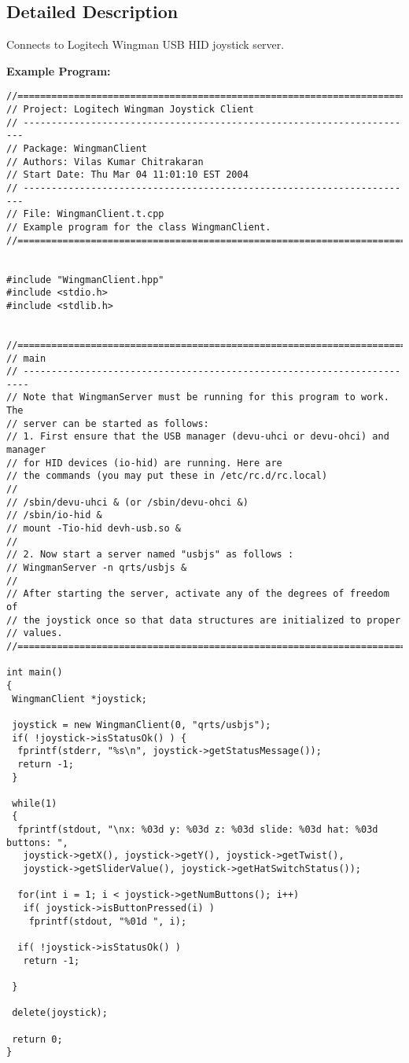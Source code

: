 \subsection{Detailed Description}
Connects to Logitech Wingman USB HID joystick server.

{\bf Example Program:}

\footnotesize\begin{verbatim}//======================================================================== 
// Project: Logitech Wingman Joystick Client 
// ---------------------------------------------------------------------- 
// Package: WingmanClient
// Authors: Vilas Kumar Chitrakaran
// Start Date: Thu Mar 04 11:01:10 EST 2004
// ----------------------------------------------------------------------  
// File: WingmanClient.t.cpp
// Example program for the class WingmanClient.
//========================================================================  
 

#include "WingmanClient.hpp"
#include <stdio.h>
#include <stdlib.h>

 
//======================================================================== 
// main 
// -----------------------------------------------------------------------
// Note that WingmanServer must be running for this program to work. The
// server can be started as follows:
// 1. First ensure that the USB manager (devu-uhci or devu-ohci) and manager 
// for HID devices (io-hid) are running. Here are
// the commands (you may put these in /etc/rc.d/rc.local)
//
// /sbin/devu-uhci & (or /sbin/devu-ohci &)
// /sbin/io-hid &
// mount -Tio-hid devh-usb.so &
// 
// 2. Now start a server named "usbjs" as follows :
// WingmanServer -n qrts/usbjs &
//
// After starting the server, activate any of the degrees of freedom of
// the joystick once so that data structures are initialized to proper
// values.
//========================================================================  
 
int main()
{
 WingmanClient *joystick;
 
 joystick = new WingmanClient(0, "qrts/usbjs");
 if( !joystick->isStatusOk() ) {
  fprintf(stderr, "%s\n", joystick->getStatusMessage());
  return -1;
 }

 while(1)
 {
  fprintf(stdout, "\nx: %03d y: %03d z: %03d slide: %03d hat: %03d buttons: ", 
   joystick->getX(), joystick->getY(), joystick->getTwist(),
   joystick->getSliderValue(), joystick->getHatSwitchStatus());
 
  for(int i = 1; i < joystick->getNumButtons(); i++)
   if( joystick->isButtonPressed(i) )
    fprintf(stdout, "%01d ", i);

  if( !joystick->isStatusOk() )
   return -1;
  
 }
 
 delete(joystick);
 
 return 0;
}

\end{verbatim}\normalsize 
 



